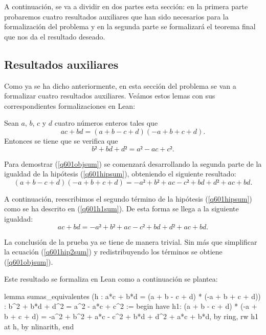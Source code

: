 A continuación, se va a dividir en dos partes esta sección: en la primera
parte probaremos cuatro resultados auxiliares que han sido necesarios para
la formalización del problema y en la segunda parte se formalizará el
teorema final que nos da el resultado deseado.

\subsection{Resultados auxiliares}
Como ya se ha dicho anteriormente, en esta sección del problema se van
a formalizar cuatro resultados auxiliares. Veámos estos lemas con sus
correspondientes formalizaciones en Lean:

\begin{lema}\label{q601lemasuma}
  Sean \(a\), \(b\), \(c\) y \(d\) cuatro números enteros tales que 
    \begin{equation}\label{q601hipsum}\tag{h}
      ac+bd = (a+b-c+d)(-a+b+c+d).
    \end{equation}
    Entonces se tiene que se verifica que
    \begin{equation}\label{q601objsum}
      b²+bd+d²=a²-ac+c².
    \end{equation}
\end{lema}

\begin{demostracion}
  Para demostrar (\ref{q601objsum}) se comenzará desarrollando la segunda
  parte de la igualdad de la hipótesis (\ref{q601hipsum}), obteniendo el
  siguiente resultado:
  \begin{equation}\tag{h1}\label{q601h1sum}
    (a+b-c+d)(-a+b+c+d)=-a²+b²+ac-c²+bd+d²+ac+bd.
  \end{equation}

  A continuación, reescribimos el segundo término de la hipótesis
  (\ref{q601hipsum}) como se ha descrito en (\ref{q601h1sum}). De esta
  forma se llega a la siguiente igualdad:
  \begin{equation}\label{q601hip2sum}
    ac+bd=-a²+b²+ac-c²+bd+d²+ac+bd.
  \end{equation}

  La conclusión de la prueba ya se tiene de manera trivial. Sin más que
  simplificar la ecuación (\ref{q601hip2sum}) y redistribuyendo los términos
  se obtiene (\ref{q601objsum}).
\end{demostracion}

Este resultado se formaliza en Lean como a continuación se plantea:
\begin{leancode}
lemma sumas_equivalentes
  (h : a*c + b*d = (a + b - c + d) * (-a + b + c + d))
  : b^2 + b*d + d^2 = a^2 - a*c + c^2 :=
begin
  have h1: (a + b - c + d) * (-a + b + c + d) =
           -a^2  + b^2  + a*c - c^2 + b*d + d^2 + a*c + b*d,
    by ring,
  rw h1 at h,
  by nlinarith,
end
\end{leancode}

